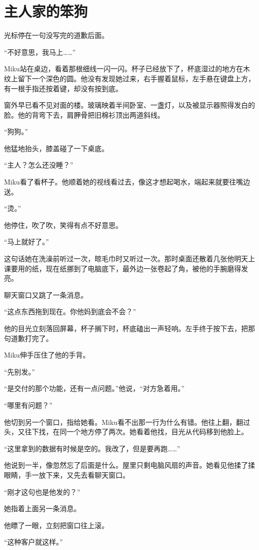 \chapter{主人家的笨狗}

光标停在一句没写完的道歉后面。

“不好意思，我马上……”

Miku站在桌边，看着那根细线一闪一闪。杯子已经放下了，杯底湿过的地方在木纹上留下一个深色的圆。他没有发现她过来，右手握着鼠标，左手悬在键盘上方，有一根手指还按着键，却没有按到底。

窗外早已看不见对面的楼。玻璃映着半间卧室、一盏灯，以及被显示器照得发白的脸。他的背弯下去，肩胛骨把旧棉衫顶出两道斜线。

“狗狗。”

他猛地抬头，膝盖碰了一下桌底。

“主人？怎么还没睡？”

Miku看了看杯子。他顺着她的视线看过去，像这才想起喝水，端起来就要往嘴边送。

“烫。”

他停住，吹了吹，笑得有点不好意思。

“马上就好了。”

这句话她在洗澡前听过一次，晾毛巾时又听过一次。那时桌面还散着几张他明天上课要用的纸，现在纸挪到了电脑底下，最外边一张卷起了角，被他的手腕磨得发亮。

聊天窗口又跳了一条消息。

“这点东西拖到现在。你他妈到底会不会？”

他的目光立刻落回屏幕，杯子搁下时，杯底磕出一声轻响。左手终于按下去，把那句道歉打完了。

Miku伸手压住了他的手背。

“先别发。”

“是交付的那个功能，还有一点问题。”他说，“对方急着用。”

“哪里有问题？”

他切到另一个窗口，指给她看。Miku看不出那一行为什么有错。他往上翻，翻过头，又往下找，在同一个地方停了两次。她看着他找，目光从代码移到他脸上。

“这里拿到的数据有时候是空的。我改了，但是要再跑……”

他说到一半，像忽然忘了后面是什么。屋里只剩电脑风扇的声音。她看见他揉了揉眼睛，手一放下来，又先去看聊天窗口。

“刚才这句也是他发的？”

她指着上面另一条消息。

他瞟了一眼，立刻把窗口往上滚。

“这种客户就这样。”


